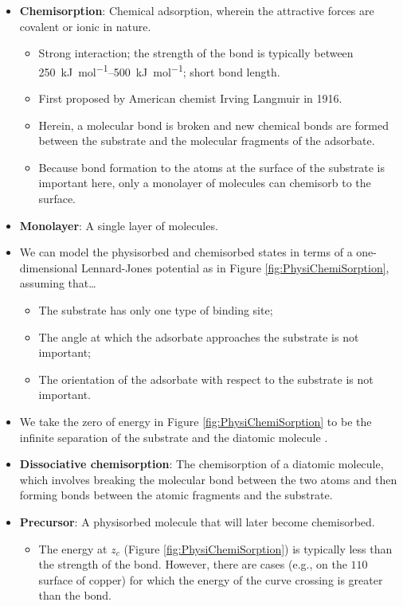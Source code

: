 \documentclass[../notes.tex]{subfiles}
\begin{document}
\begin{itemize}
\begin{itemize}
    \end{itemize}
    \item \textbf{Chemisorption}: Chemical adsorption, wherein the attractive forces are covalent or ionic in nature.
    \begin{itemize}
        \item Strong interaction; the strength of the bond is typically between \SIrange{250}{500}{\kilo\joule\per\mole}; short bond length.
        \item First proposed by American chemist Irving Langmuir in 1916.
        \item Herein, a molecular bond is broken and new chemical bonds are formed between the substrate and the molecular fragments of the adsorbate.
        \item Because bond formation to the atoms at the surface of the substrate is important here, only a monolayer of molecules can chemisorb to the surface.
    \end{itemize}
    \item \textbf{Monolayer}: A single layer of molecules.
    \item We can model the physisorbed and chemisorbed states in terms of a one-dimensional Lennard-Jones potential as in Figure \ref{fig:PhysiChemiSorption}, assuming that\dots
    \begin{itemize}
        \item The substrate has only one type of binding site;
        \item The angle at which the adsorbate approaches the substrate is not important;
        \item The orientation of the adsorbate with respect to the substrate is not important.
    \end{itemize}
    \item We take the zero of energy in Figure \ref{fig:PhysiChemiSorption} to be the infinite separation of the substrate and the diatomic molecule .
    \item \textbf{Dissociative chemisorption}: The chemisorption of a diatomic molecule, which involves breaking the molecular bond between the two atoms and then forming bonds between the atomic fragments and the substrate.
    \item \textbf{Precursor}: A physisorbed molecule that will later become chemisorbed.
    \begin{itemize}
        \item The energy at $z_c$ (Figure \ref{fig:PhysiChemiSorption}) is typically less than the strength of the  bond. However, there are cases (e.g.,  on the $110$ surface of copper) for which the energy of the curve crossing is greater than the  bond.

\end{itemize}
\end{itemize}
\end{document}

